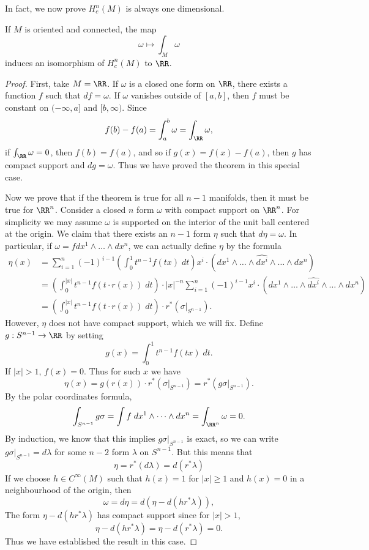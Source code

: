 In fact, we now prove $H^n_c(M)$ is always one dimensional.

\begin{theorem}
    If $M$ is oriented and connected, the map
    \[ \omega \mapsto \int_M \omega \]
    induces an isomorphism of $H^n_c(M)$ to $\RR$.
\end{theorem}
\begin{proof}
    First, take $M = \RR$. If $\omega$ is a closed one form on $\RR$, there exists a function $f$ such that $df = \omega$. If $\omega$ vanishes outside of $[a,b]$, then $f$ must be constant on $(-\infty,a]$ and $[b,\infty)$. Since
    \[ f(b) - f(a) = \int_a^b \omega = \int_{\RR} \omega, \]
    if $\int_{\RR} \omega = 0$, then $f(b) = f(a)$, and so if $g(x) = f(x) - f(a)$, then $g$ has compact support and $dg = \omega$. Thus we have proved the theorem in this special case.

    Now we prove that if the theorem is true for all $n-1$ manifolds, then it must be true for $\RR^n$. Consider a closed $n$ form $\omega$ with compact support on $\RR^n$. For simplicity we may assume $\omega$ is supported on the interior of the unit ball centered at the origin. We claim that there exists an $n-1$ form $\eta$ such that $d\eta = \omega$. In particular, if $\omega = f dx^1 \wedge \dots \wedge dx^n$, we can actually define $\eta$ by the formula
    \begin{align*}
        \eta(x) &= \sum_{i = 1}^n (-1)^{i-1} \left( \int_0^1 t^{n-1} f(tx)\; dt \right) x^i \cdot (dx^1 \wedge \dots \wedge \widehat{dx^i} \wedge \dots \wedge dx^n)\\
        &= \left( \int_0^{|x|} t^{n-1} f(t \cdot r(x))\; dt \right) \cdot |x|^{-n} \sum_{i = 1}^n (-1)^{i-1} x^i \cdot (dx^1 \wedge \dots \wedge \widehat{dx^i} \wedge \dots \wedge dx^n)\\
        &= \left( \int_0^{|x|} t^{n-1} f(t \cdot r(x))\; dt \right) \cdot r^*(\sigma|_{S^{n-1}}).
    \end{align*}
    However, $\eta$ does not have compact support, which we will fix. Define $g: S^{n-1} \to \RR$ by setting
    \[ g(x) = \int_0^1 t^{n-1} f(tx)\; dt. \]
    If $|x| > 1$, $f(x) = 0$. Thus for such $x$ we have
    \[ \eta(x) = g(r(x)) \cdot r^*(\sigma|_{S^{n-1}}) = r^*(g \sigma|_{S^{n-1}}). \]
    By the polar coordinates formula,
    \[ \int_{S^{n-1}} g \sigma = \int f\; dx^1 \wedge \dots \wedge dx^n = \int_{\RR^n} \omega = 0. \]
    By induction, we know that this implies $g \sigma|_{S^{n-1}}$ is exact, so we can write $g \sigma|_{S^{n-1}} = d\lambda$ for some $n-2$ form $\lambda$ on $S^{n-1}$. But this means that
    \[ \eta = r^*(d\lambda) = d(r^* \lambda) \]
    If we choose $h \in C^\infty(M)$ such that $h(x) = 1$ for $|x| \geq 1$ and $h(x) = 0$ in a neighbourhood of the origin, then
    \[ \omega = d\eta = d(\eta - d(h r^* \lambda)), \]
    The form $\eta - d(h r^* \lambda)$ has compact support since for $|x| > 1$,
    \[ \eta - d(h r^* \lambda) = \eta - d(r^* \lambda) = 0. \]
    Thus we have established the result in this case.


\end{proof}
